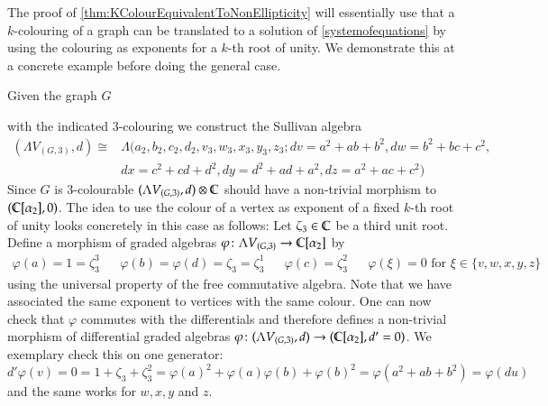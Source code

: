 The proof of \ref{thm:KColourEquivalentToNonEllipticity} will essentially use that a $k$-colouring
 of a graph can be translated to a solution of \ref{systemofequations} by using the colouring
 as exponents for a $k$-th root of unity.
 We demonstrate this at a concrete example before doing the general case.
  \begin{Example}
   Given the graph $G$
   \begin{center}
    

   \end{center}

with the indicated $3$-colouring we construct the Sullivan algebra 
\begin{align*} 
(\Lambda V_{(G,3)},d) \cong &\Lambda(a_2,b_2,c_2,d_2,v_3,w_3,x_3,y_3,z_3 ; dv = a^2 + ab + b^2, dw = b^2 + bc + c^2, \\
 &dx = c^2 + cd + d^2, dy = d^2 + ad + a^2 , dz = a^2 + ac + c^2)
\end{align*}
Since $G$ is $3$-colourable $(\Lambda V_{(G,3)},d) \otimes \mathbb{C}$  should have a non-trivial morphism to
$( \mathbb{C}[\alpha_2], 0)$. The idea to use the colour of a vertex as exponent of a fixed $k$-th root of unity looks 
concretely in this case as follows:
Let $\zeta_3 \in \mathbb{C}$ be a third unit root. Define a morphism of graded algebras
$\varphi \colon \Lambda V_{(G,3)} \to \mathbb{C} [ \alpha_2]$ by 
\begin{align*}
\varphi(a) = 1 = \zeta_3^3 & & \varphi(b) = \varphi(d) = \zeta_3 = \zeta_3^1&  & \varphi(c) = \zeta_3^2 & &
\text{$\varphi(\xi) = 0$ for $\xi \in \lbrace v,w,x,y,z \rbrace$} 
\end{align*}
using the universal property of the free commutative algebra. Note that we have associated the same exponent
to vertices with the same colour.
One can now check that $\varphi$ commutes with the differentials and therefore defines a non-trivial morphism of differential graded algebras
$\varphi \colon (\Lambda V_{(G,3)}, d) \to (\mathbb{C} [ \alpha_2],d' = 0)$. We exemplary check this on one generator:
$$d'\varphi(v) = 0 = 1 + \zeta_3 + \zeta_3^2 = \varphi( a)^2 + \varphi( a)\varphi(b) + \varphi ( b)^2 = 
\varphi(a^2 + ab + b^2) = \varphi( du)$$
and the same works for $w,x,y$ and $z$. 
  \end{Example}

